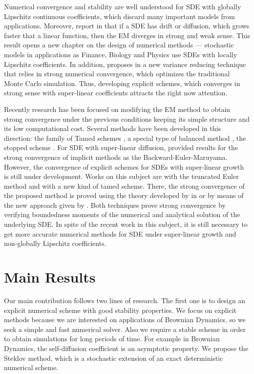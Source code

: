 		Numerical convergence and stability are well understood for SDE with globally Lipschitz 
	continuous coefficients, which discard  many important models from applications.
	Moreover, \citeauthor*{Hutzenthaler2009} report in \cite{Hutzenthaler2009} that if a SDE
	has drift or diffusion,	which grows faster that a linear function, then the EM diverges in strong and weak sense.
	This result opens a new chapter on the design of numerical methods ---
	stochastic models in applications as Finance, Biology and Physics use SDEs with locally Lipschitz 
	coefficients. In addition, \citeauthor*{Giles2008} proposes in \cite{Giles2008} a new variance reducing technique
	that relies in strong numerical convergence, which optimizes the traditional Monte Carlo simulation. Thus, 
	developing	explicit schemes, which converges in strong sense with super-linear coefficients attracts the right 
	now attention.
	
		Recently research has been focused on modifying the EM method to obtain strong convergence  under 
	the previous conditions keeping its simple structure and  its low computational cost. Several methods have been 
	developed in this direction:  the family of  Tamed schemes
	\cite{Hutzenthaler2012a, Wang2011, Zong2014,Hutzenthaler2015}, 
	a special type of balanced method \cite{Tretyakov2013},  the stopped scheme \cite{Liu2013a} .
	For SDE with super-linear diffusion, \citeauthor{Mao2013a} provided results
	for the strong convergence of implicit methods as the Backward-Euler-Maruyama. However, the convergence of explicit 
	schemes for SDEs with super-linear growth is still under development. Works on this subject  are
	\citeauthor{Mao2015} \cite{Mao2015} with the truncated Euler method and \cite{Sabanis2015} with a new kind of
	tamed scheme. There, the strong convergence of the proposed method
	is proved using the theory developed by in \citet*{Higham2002b} or by means of  the new 
	approach given by  \citet{Hutzenthaler2015}.
	Both techniques prove strong convergence by verifying boundedness moments of the numerical and 
	analytical solution of the underlying SDE. In spite of the recent work in this subject,  it is still necessary
	to get more accurate numerical methods for SDE under super-linear growth and 
	non-globally Lipschitz coefficients.

\section{Main Results}
		Our main contribution follows two lines of research. The first one is to design an explicit numerical
	scheme with good stability properties. We focus on explicit methods because we are interested on applications of 
	Brownian Dynamics, so we seek a simple and fast numerical solver. Also we require a stable scheme 
	in order to obtain  simulations for long periods of time. For example in Brownian Dynamics, the self-diffusion
	coefficient is an asymptotic property. We propose the Steklov method, which is a stochastic 
	extension of an exact deterministic numerical scheme. 
		
